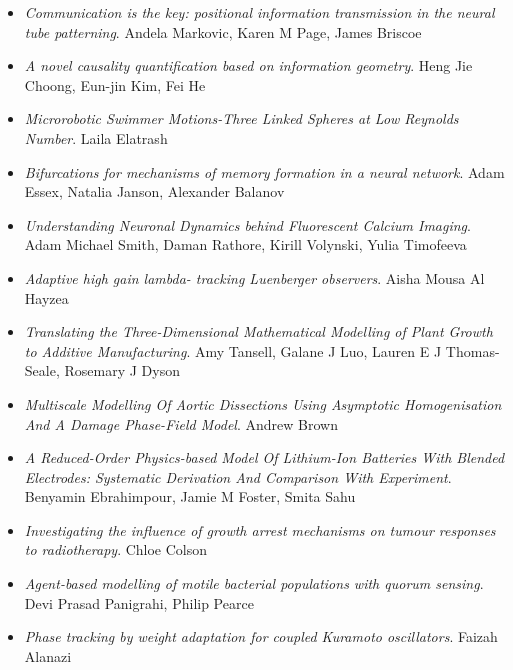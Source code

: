 \begin{itemize}
\item \textit{Communication is the key: positional information transmission in the neural tube patterning}.
Andela Markovic, Karen M Page, James Briscoe

\item \textit{A novel causality quantification based on information geometry}.
Heng Jie Choong, Eun-jin Kim, Fei He

\item \textit{Microrobotic Swimmer Motions-Three Linked Spheres at Low Reynolds Number}.
Laila Elatrash

\item \textit{Bifurcations for mechanisms of memory formation in a neural network}.
Adam Essex, Natalia Janson, Alexander Balanov

\item \textit{Understanding Neuronal Dynamics behind Fluorescent Calcium Imaging}.
Adam Michael Smith, Daman Rathore, Kirill Volynski, Yulia Timofeeva

\item \textit{Adaptive high gain lambda- tracking Luenberger observers}.
Aisha Mousa Al Hayzea

\item \textit{Translating the Three-Dimensional Mathematical Modelling of Plant Growth to Additive Manufacturing}.
Amy Tansell, Galane J Luo, Lauren E J Thomas-Seale, Rosemary J Dyson

\item \textit{Multiscale Modelling Of Aortic Dissections Using Asymptotic Homogenisation And A Damage Phase-Field Model}.
Andrew Brown

\item \textit{A Reduced-Order Physics-based Model Of Lithium-Ion Batteries With Blended Electrodes: Systematic Derivation And Comparison With Experiment}.
Benyamin Ebrahimpour, Jamie M Foster, Smita Sahu

\item \textit{Investigating the influence of growth arrest mechanisms on tumour responses to radiotherapy}.
Chloe Colson

\item \textit{Agent-based modelling of motile bacterial populations with quorum sensing}.
Devi Prasad Panigrahi, Philip Pearce

\item \textit{Phase tracking by weight adaptation for coupled Kuramoto oscillators}.
Faizah Alanazi


\end{itemize}
